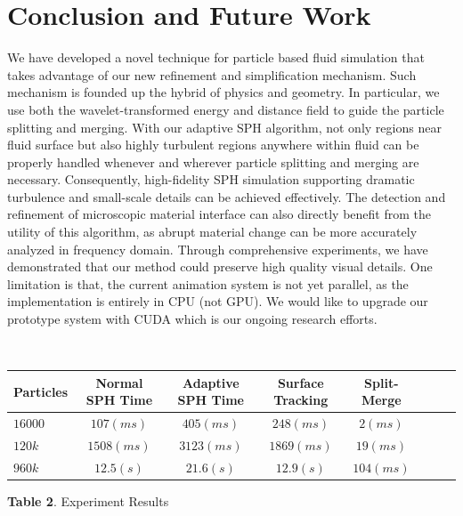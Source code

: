 
\section{Conclusion and Future Work}

We have developed a novel technique for particle based fluid
simulation that takes advantage of our new refinement and
simplification mechanism. Such mechanism is founded up the hybrid of
physics and geometry. In particular, we use both the
wavelet-transformed energy and distance field to guide the particle
splitting and merging. With our adaptive SPH algorithm, not only
regions near fluid surface but also highly turbulent regions anywhere
within fluid can be properly handled whenever and wherever particle
splitting and merging are necessary. Consequently, high-fidelity SPH
simulation supporting dramatic turbulence and small-scale details can
be achieved effectively. The detection and refinement of microscopic
material interface can also directly benefit from the utility of this
algorithm, as abrupt material change can be more accurately analyzed
in frequency domain. Through comprehensive experiments, we have
demonstrated that our method could preserve high quality visual
details. One limitation is that, the current animation system is not
yet parallel, as the implementation is entirely in CPU (not GPU). We
would like to upgrade our prototype system with CUDA which is our
ongoing research efforts.


%




\newpage

\onecolumn
~\\
\begin{center}
   \begin{tabular}{l*{6}{c}r}
        Particles & Normal SPH Time & Adaptive SPH Time & Surface Tracking & Split-Merge \\
        \hline
        $16000$ & $107(ms)$ & $405(ms)$ & $248(ms)$ & $2(ms)$ \\
        $120k$ & $1508(ms)$ & $3123(ms)$ & $1869(ms)$ & $19(ms)$ \\
        $960k$ & $12.5(s)$ & $21.6(s)$ & $12.9(s)$ & $104(ms)$ \\
    \end{tabular}

    \textbf{Table 2}. Experiment Results
\end{center}

